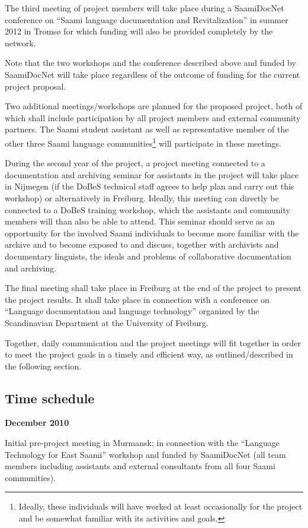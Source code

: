 \documentclass[a4paper,12pt]{article}
\begin{document}
{{The third meeting of project members will take place during a SaamiDocNet conference on “Saami language documentation and Revitalization” in summer 2012 in Tromsø for which funding will also be provided completely by the network.

Note that the two workshops and the conference described above and funded by SaamiDocNet will take place regardless of the outcome of funding for the current project proposal.

Two additional meetings/workshops are planned for the proposed project, both of which shall include participation by all project members and external community partners. The Saami student assistant as well as representative member of the other three Saami language communities\footnote{Ideally, these individuals will have worked at least occasionally for the project and be somewhat familiar with its activities and goals.} will participate in these meetings. 

During the second year of the project, a project meeting connected to a documentation and archiving seminar for assistants in the project will take place in Nijmegen (if the DoBeS technical staff agrees to help plan and carry out this workshop) or alternatively in Freiburg. Ideally, this meeting can directly be connected to a DoBeS training workshop, which the assistants and community members will than also be able to attend. This seminar should serve as an opportunity for the involved Saami individuals to become more familiar with the archive and to become exposed to and discuss, together with archivists and documentary linguists, the ideals and problems of collaborative documentation and archiving.

The final meeting shall take place in Freiburg at the end of the project to present the project results. It shall take place in connection with a conference on “Language documentation and language technology” organized by the Scandinavian Department at the University of Freiburg.

Together, daily communication and the project meetings will fit together in order to meet the project goals in a timely and efficient way, as outlined/described in the following section.

\subsection{Time schedule}

\noindent \textbf{December 2010}

Initial pre-project meeting in Murmansk; in connection with the “Language Technology for East Saami” workshop and funded by SaamiDocNet (all team members including assistants and external consultants from all four Saami communities).\\

}}
\end{document}
